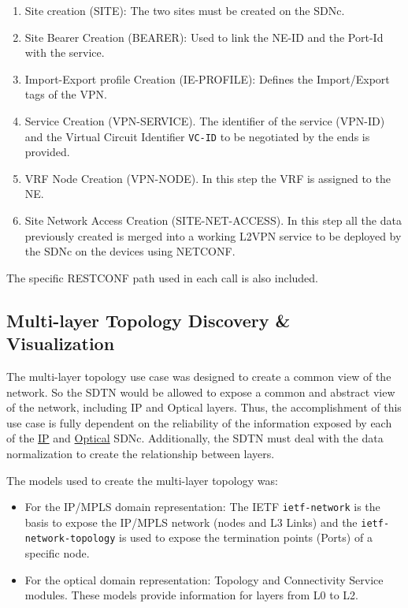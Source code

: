 \documentclass[a4paper,fleqn]{cas-dc}
\begin{document}
\begin{enumerate}
    \item Site creation (SITE): The two sites must be created on the SDNc.
    \item Site Bearer Creation (BEARER): Used to link the NE-ID and the Port-Id with the service.
    \item Import-Export profile Creation (IE-PROFILE): Defines the Import/Export tags of the VPN. 
    \item Service Creation (VPN-SERVICE). The identifier of the service (VPN-ID) and the Virtual Circuit Identifier \texttt{VC-ID} to be negotiated by the ends is provided.  
    \item VRF Node Creation (VPN-NODE). In this step the VRF is assigned to the NE.
    \item Site Network Access Creation (SITE-NET-ACCESS). In this step all the data previously created is merged into a working L2VPN service to be deployed by the SDNc on the devices using NETCONF.
\end{enumerate}
The specific RESTCONF path used in each call is also included.


\subsection{Multi-layer Topology Discovery \& Visualization}

The multi-layer topology use case was designed to create a common view of the network. So the SDTN would be allowed to expose a common and abstract view of the network, including IP and Optical layers. Thus, the accomplishment of this use case is fully dependent on the reliability of the information exposed by each of the \hyperref[subsection:IPtopo]{IP} and \hyperref[subsection:OPTopo]{Optical} SDNc. Additionally, the SDTN must deal with the data normalization to create the relationship between layers. 

The models used to create the multi-layer topology was:
\begin{itemize}
    \item For the IP/MPLS domain representation: The IETF \texttt{ietf-network} is the basis to expose the IP/MPLS network (nodes and L3 Links) and the \texttt{ietf-network-topology} is used to expose the termination points (Ports) of a specific node.
    \item For the optical domain representation: Topology and Connectivity Service modules. These models provide information for layers from L0 to L2.
\end{itemize}
    
\end{document}
